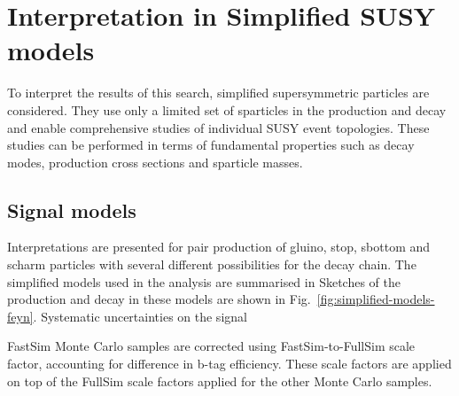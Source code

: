 \section{Interpretation in Simplified SUSY models}
\label{sec:susy}
To interpret the results of this search, simplified
supersymmetric particles are considered.  They use only a limited set of
sparticles in the production and decay and enable comprehensive studies of
individual SUSY event topologies. These studies can be performed in terms of
fundamental properties such as decay modes, production cross sections and
sparticle masses.

\subsection{Signal models}
\label{sec:susy_models}
Interpretations are presented for pair production of gluino, stop, sbottom and
scharm particles with several different possibilities for the decay chain. The
simplified models used in the analysis are summarised in
Sketches of the production and decay in these models are shown in
Fig.~\ref{fig:simplified-models-feyn}. Systematic uncertainties on the signal

FastSim Monte Carlo samples are corrected using FastSim-to-FullSim scale factor,
accounting for difference in b-tag efficiency. These scale factors are applied
on top of the FullSim scale factors applied for the other Monte Carlo samples.

